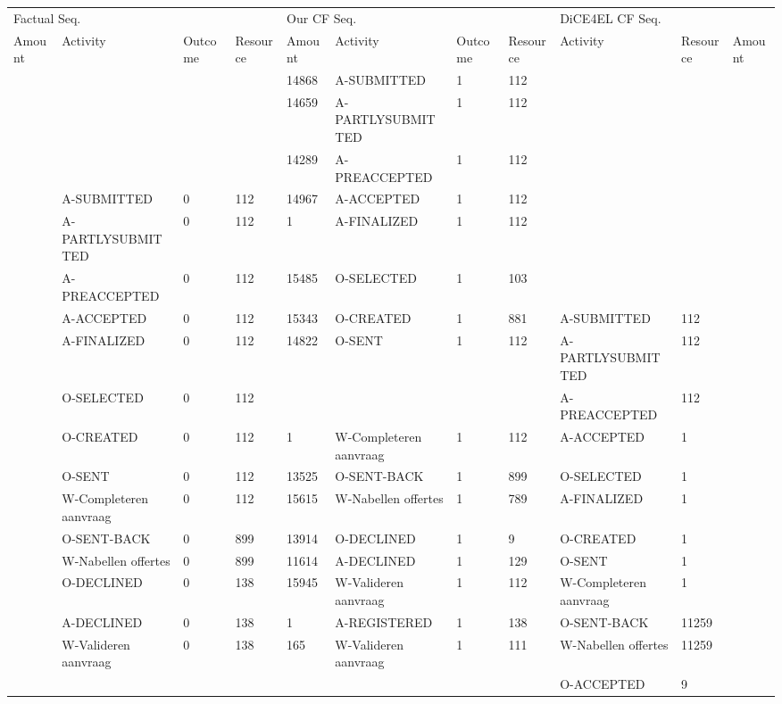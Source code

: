 \begin{tabular}{lllllllllll}
\toprule
\multicolumn{4}{l}{Factual Seq.} & \multicolumn{4}{l}{Our CF Seq.} & \multicolumn{3}{l}{DiCE4EL CF Seq.} \\
Amount & Activity & Outcome & Resource & Amount & Activity & Outcome & Resource & Activity & Resource & Amount \\
\midrule
 &  &  &  & 14868 & A-SUBMITTED & 1 & 112 &  &  &  \\
 &  &  &  & 14659 & A-PARTLYSUBMITTED & 1 & 112 &  &  &  \\
 &  &  &  & 14289 & A-PREACCEPTED & 1 & 112 &  &  &  \\
 & A-SUBMITTED & 0 & 112 & 14967 & A-ACCEPTED & 1 & 112 &  &  &  \\
 & A-PARTLYSUBMITTED & 0 & 112 & 1 & A-FINALIZED & 1 & 112 &  &  &  \\
 & A-PREACCEPTED & 0 & 112 & 15485 & O-SELECTED & 1 & 103 &  &  &  \\
 & A-ACCEPTED & 0 & 112 & 15343 & O-CREATED & 1 & 881 & A-SUBMITTED & 112 &  \\
 & A-FINALIZED & 0 & 112 & 14822 & O-SENT & 1 & 112 & A-PARTLYSUBMITTED & 112 &  \\
 & O-SELECTED & 0 & 112 &  &  &  &  & A-PREACCEPTED & 112 &  \\
 & O-CREATED & 0 & 112 & 1 & W-Completeren aanvraag & 1 & 112 & A-ACCEPTED & 1 &  \\
 & O-SENT & 0 & 112 & 13525 & O-SENT-BACK & 1 & 899 & O-SELECTED & 1 &  \\
 & W-Completeren aanvraag & 0 & 112 & 15615 & W-Nabellen offertes & 1 & 789 & A-FINALIZED & 1 &  \\
 & O-SENT-BACK & 0 & 899 & 13914 & O-DECLINED & 1 & 9 & O-CREATED & 1 &  \\
 & W-Nabellen offertes & 0 & 899 & 11614 & A-DECLINED & 1 & 129 & O-SENT & 1 &  \\
 & O-DECLINED & 0 & 138 & 15945 & W-Valideren aanvraag & 1 & 112 & W-Completeren aanvraag & 1 &  \\
 & A-DECLINED & 0 & 138 & 1 & A-REGISTERED & 1 & 138 & O-SENT-BACK & 11259 &  \\
 & W-Valideren aanvraag & 0 & 138 & 165 & W-Valideren aanvraag & 1 & 111 & W-Nabellen offertes & 11259 &  \\
 &  &  &  &  &  &  &  & O-ACCEPTED & 9 &  \\
\bottomrule
\end{tabular}

